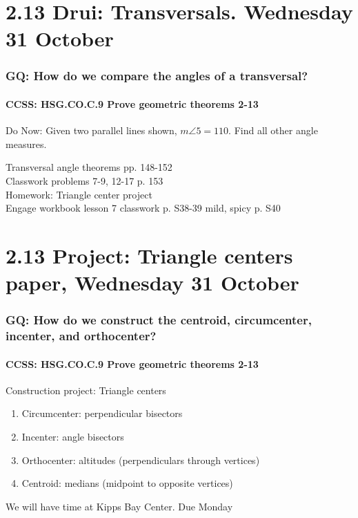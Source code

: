 \documentclass{beamer}
\begin{document}
\section{2.13 Drui: Transversals. Wednesday 31 October}
  \frame
  {
    \frametitle{GQ: How do we compare the angles of a transversal?}
    \framesubtitle{CCSS: HSG.CO.C.9 Prove geometric theorems  \alert{2-13}}

    \begin{block}{Do Now: Given two parallel lines shown, $m\angle 5=110$. Find all other angle measures.}
    \begin{enumerate}
      \begin{center}
      \end{center}    \end{enumerate}
    \end{block}
    Transversal angle theorems pp. 148-152\\
    Classwork problems 7-9, 12-17 p. 153\\
    \vspace{0.2cm}
    Homework: Triangle center project\\
    Engage workbook lesson 7 classwork p. S38-39 mild, spicy p. S40
  }

\section{2.13 Project: Triangle centers paper, Wednesday 31 October}
  \frame
  {
    \frametitle{GQ: How do we construct the centroid, circumcenter, incenter, and orthocenter?}
    \framesubtitle{CCSS: HSG.CO.C.9 Prove geometric theorems  \alert{2-13}}

    \begin{block}{Construction project: Triangle centers}
    \begin{enumerate}
        \item Circumcenter: perpendicular bisectors
        \item Incenter: angle bisectors
        \item Orthocenter: altitudes (perpendiculars through vertices)
        \item Centroid: medians (midpoint to opposite vertices)
    \end{enumerate}
    \end{block}
    We will have time at Kipps Bay Center. Due Monday
    }
\end{document}

